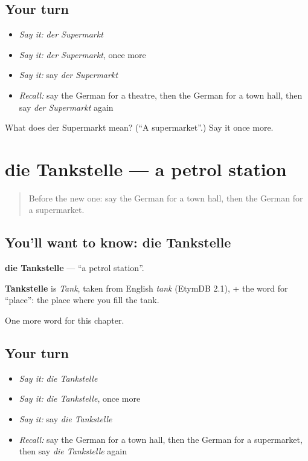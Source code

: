 \subsection*{Your turn}
\begin{itemize}
\raggedright
  \item \emph{Say it:} \emph{der Supermarkt}
  \item \emph{Say it:} \emph{der Supermarkt}, once more
  \item \emph{Say it:} say \emph{der Supermarkt}
  \item \emph{Recall:} say the German for a theatre, then the German for a town hall, then say \emph{der Supermarkt} again
\end{itemize}

\begin{tcolorbox}[breakable,colback=teal!4,colframe=teal!35!black,title={Before you move on}]
What does der Supermarkt mean? (\textquotedblleft{}A supermarket\textquotedblright{}.) Say it once more.
\end{tcolorbox}
\section[die Tankstelle]{die Tankstelle — a petrol station}

\label{lesson:GE-C106-tankstelle}



\begin{quote}
Before the new one: say the German for a town hall, then the German for a supermarket.
\end{quote}

\subsection*{You'll want to know: die Tankstelle}
\textbf{die Tankstelle} — \textquotedblleft{}a petrol station\textquotedblright{}.

\begin{cousinweb}
\textbf{Tankstelle} is \emph{Tank}, taken from English \emph{tank} (EtymDB 2.1), + the word for \textquotedblleft{}place\textquotedblright{}: the place where you fill the tank.
\end{cousinweb}

\begin{grammarlens}[title={What you've built}]
One more word for this chapter.
\end{grammarlens}

\subsection*{Your turn}
\begin{itemize}
\raggedright
  \item \emph{Say it:} \emph{die Tankstelle}
  \item \emph{Say it:} \emph{die Tankstelle}, once more
  \item \emph{Say it:} say \emph{die Tankstelle}
  \item \emph{Recall:} say the German for a town hall, then the German for a supermarket, then say \emph{die Tankstelle} again
\end{itemize}

